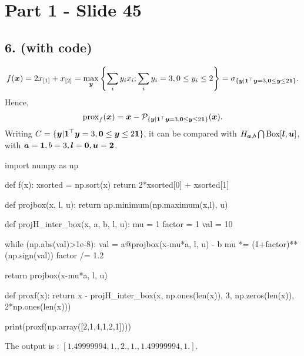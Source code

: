 \section{Part 1 - Slide 45}
%
\subsection{6. (with code)}
%
\begin{equation*}
    f(\boldsymbol x) = 2 x_{[1]} + x_{[2]} 
    = \max_{\boldsymbol y} \left\{ \sum_{i} y_i x_i; \sum_i y_i=3, 0 \le
    y_i \le 2 \right\} = \sigma_{\{ \boldsymbol y|\boldsymbol 1^\top \boldsymbol y = 3, 
    \boldsymbol 0 \le \boldsymbol y \le 2 \boldsymbol 1 \}}.
\end{equation*}
%
Hence,
%
\begin{equation*}
    \operatorname{prox}_f(\boldsymbol x) = \boldsymbol x - \mathcal P_{\{ \boldsymbol y|\boldsymbol 1^\top \boldsymbol y = 3, 
    \boldsymbol 0 \le \boldsymbol y \le 2 \boldsymbol 1 \}} (\boldsymbol x).
\end{equation*}
%
Writing $C=\{ \boldsymbol y|\boldsymbol 1^\top \boldsymbol y = 3, 
\boldsymbol 0 \le \boldsymbol y \le 2 \boldsymbol 1 \}$, it can be compared with 
$H_{\boldsymbol a, b} \bigcap \text{Box}[\boldsymbol l, \boldsymbol u]$, with 
$\boldsymbol a=\boldsymbol 1, b=3, \boldsymbol l=\boldsymbol 0, \boldsymbol u = \boldsymbol 2$.
%
\begin{python}
import numpy as np

def f(x):
    xsorted = np.sort(x)
    return 2*xsorted[0] + xsorted[1]

def projbox(x, l, u):
    return np.minimum(np.maximum(x,l), u)

def projH_inter_box(x, a, b, l, u):
    mu = 1
    factor = 1
    val = 10

    while (np.abs(val)>1e-8):
        val = a@projbox(x-mu*a, l, u) - b
        mu *= (1+factor)**(np.sign(val))
        factor /= 1.2

    return projbox(x-mu*a, l, u)

def proxf(x):
    return x - projH_inter_box(x, np.ones(len(x)), 3, np.zeros(len(x)), 2*np.ones(len(x)))  

print(proxf(np.array([2,1,4,1,2,1])))
\end{python}
%
The output is : $[1.49999994, 1., 2., 1., 1.49999994, 1.]$.
%
